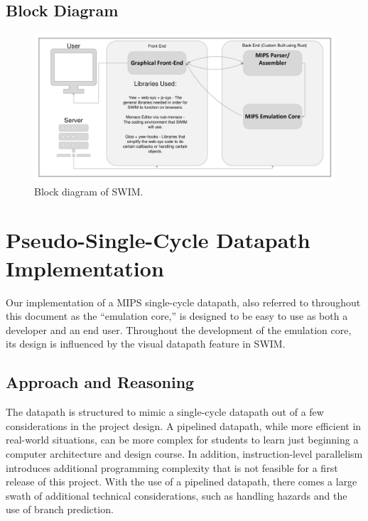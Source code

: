 \documentclass[
    paper=letter,
    parskip=half,
    fontsize=12pt,
    titlepage=firstiscover,
    toc=bibliography,
    numbers=endperiod
]{scrartcl}
\let\oldsection\section
\renewcommand{\section}{\newpage\oldsection}
\begin{document}
\subsection{Block Diagram}

\begin{figure}[H]
    \includegraphics[width=\textwidth]{block-diagram}
    \caption{Block diagram of SWIM.}
    \label{fig:block-diagram}
\end{figure}

\section{Pseudo-Single-Cycle Datapath Implementation}
\label{sec:emulation-core}

Our implementation of a MIPS single-cycle datapath, also referred to
throughout this document as the ``emulation core,'' is designed to be
easy to use as both a developer and an end user. Throughout the
development of the emulation core, its design is influenced by the
visual datapath feature in SWIM.

\subsection{Approach and Reasoning}

The datapath is structured to mimic a single-cycle datapath out of a few
considerations in the project design. A pipelined datapath, while more
efficient in real-world situations, can be more complex for students to
learn just beginning a computer architecture and design course. In
addition, instruction-level parallelism introduces additional
programming complexity that is not feasible for a first release of this
project. With the use of a pipelined datapath, there comes a large swath
of additional technical considerations, such as handling hazards and the
use of branch prediction.
\end{document}
